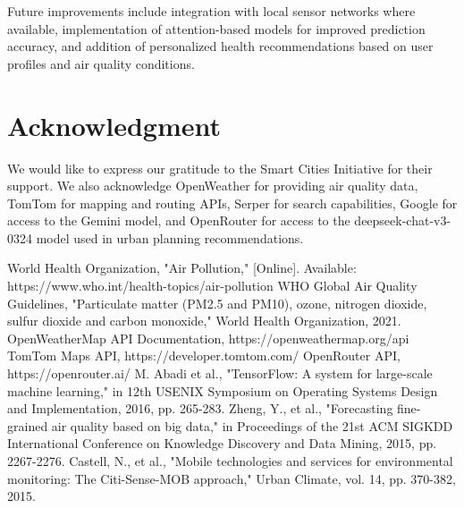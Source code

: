 \documentclass[conference]{IEEEtran}
\begin{document}
Future improvements include integration with local sensor networks where available, implementation of attention-based models for improved prediction accuracy, and addition of personalized health recommendations based on user profiles and air quality conditions.

\section*{Acknowledgment}
We would like to express our gratitude to the Smart Cities Initiative for their support. We also acknowledge OpenWeather for providing air quality data, TomTom for mapping and routing APIs, Serper for search capabilities, Google for access to the Gemini model, and OpenRouter for access to the deepseek-chat-v3-0324 model used in urban planning recommendations.

\begin{thebibliography}{00}
 World Health Organization, "Air Pollution," [Online]. Available: https://www.who.int/health-topics/air-pollution
 WHO Global Air Quality Guidelines, "Particulate matter (PM2.5 and PM10), ozone, nitrogen dioxide, sulfur dioxide and carbon monoxide," World Health Organization, 2021.
 OpenWeatherMap API Documentation, https://openweathermap.org/api
 TomTom Maps API, https://developer.tomtom.com/
 OpenRouter API, https://openrouter.ai/
 M. Abadi et al., "TensorFlow: A system for large-scale machine learning," in 12th USENIX Symposium on Operating Systems Design and Implementation, 2016, pp. 265-283.
 Zheng, Y., et al., "Forecasting fine-grained air quality based on big data," in Proceedings of the 21st ACM SIGKDD International Conference on Knowledge Discovery and Data Mining, 2015, pp. 2267-2276.
 Castell, N., et al., "Mobile technologies and services for environmental monitoring: The Citi-Sense-MOB approach," Urban Climate, vol. 14, pp. 370-382, 2015.
\end{thebibliography}
\end{document}
